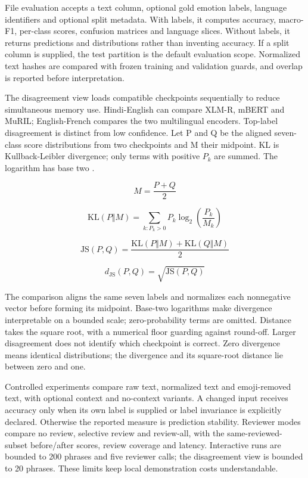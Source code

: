 \documentclass[conference]{IEEEtran}
\begin{document}
File evaluation accepts a text column, optional gold emotion labels, language identifiers and optional split metadata. With labels, it computes accuracy, macro-F1, per-class scores, confusion matrices and language slices. Without labels, it returns predictions and distributions rather than inventing accuracy. If a split column is supplied, the test partition is the default evaluation scope. Normalized text hashes are compared with frozen training and validation guards, and overlap is reported before interpretation.

The disagreement view loads compatible checkpoints sequentially to reduce simultaneous memory use. Hindi-English can compare XLM-R, mBERT and MuRIL; English-French compares the two multilingual encoders. Top-label disagreement is distinct from low confidence. Let P and Q be the aligned seven-class score distributions from two checkpoints and M their midpoint. KL is Kullback-Leibler divergence; only terms with positive \(P_k\) are summed. The logarithm has base two \cite{lin1991}.

\begin{equation}
M=\frac{P+Q}{2}
\label{eq:js_mixture}
\end{equation}

\begin{equation}
\mathrm{KL}(P\Vert M)=\sum_{k:P_k>0}P_k\log_2\!\left(\frac{P_k}{M_k}\right)
\label{eq:kl}
\end{equation}

\begin{equation}
\mathrm{JS}(P,Q)=\frac{\mathrm{KL}(P\Vert M)+\mathrm{KL}(Q\Vert M)}{2}
\label{eq:js}
\end{equation}

\begin{equation}
d_{\mathrm{JS}}(P,Q)=\sqrt{\mathrm{JS}(P,Q)}
\label{eq:js_distance}
\end{equation}

The comparison aligns the same seven labels and normalizes each nonnegative vector before forming its midpoint. Base-two logarithms make divergence interpretable on a bounded scale; zero-probability terms are omitted. Distance takes the square root, with a numerical floor guarding against round-off. Larger disagreement does not identify which checkpoint is correct. Zero divergence means identical distributions; the divergence and its square-root distance lie between zero and one.

Controlled experiments compare raw text, normalized text and emoji-removed text, with optional context and no-context variants. A changed input receives accuracy only when its own label is supplied or label invariance is explicitly declared. Otherwise the reported measure is prediction stability. Reviewer modes compare no review, selective review and review-all, with the same-reviewed-subset before/after scores, review coverage and latency. Interactive runs are bounded to 200 phrases and five reviewer calls; the disagreement view is bounded to 20 phrases. These limits keep local demonstration costs understandable.
\end{document}

